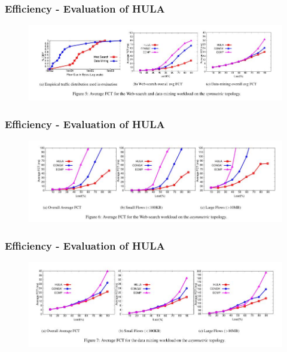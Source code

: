 \documentclass{beamer}
\begin{document}
 
 \begin{frame}
 	\frametitle{Efficiency - Evaluation of HULA}
 	
 	\begin{figure}
 		\includegraphics[width=1.05\linewidth]{19}
 	\end{figure}
 \end{frame}
 
 
  \begin{frame}
  	\frametitle{Efficiency - Evaluation of HULA}
  	
  	\begin{figure}
  		\includegraphics[width=1.05\linewidth]{20}
  	\end{figure}
  \end{frame}
  
  
   \begin{frame}
   	\frametitle{Efficiency - Evaluation of HULA}
   	
   	\begin{figure}
   		\includegraphics[width=1.05\linewidth]{21}
   	\end{figure}
   \end{frame}
   
\end{document}
